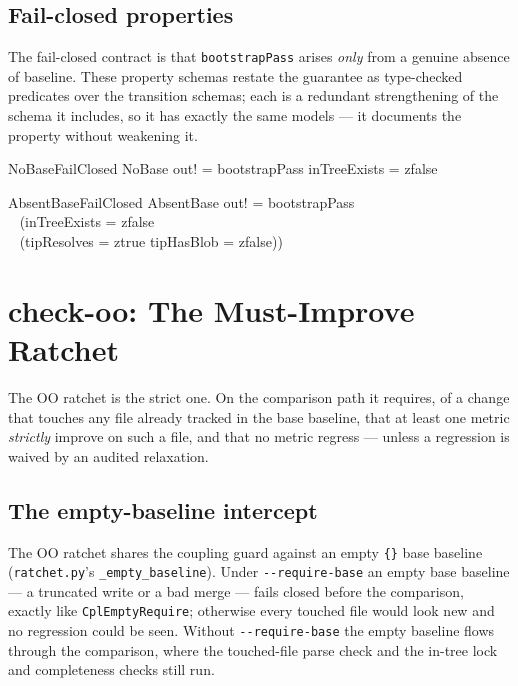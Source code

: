 \documentclass[a4paper,10pt,fleqn]{article}
\begin{document}
\subsection{Fail-closed properties}

The fail-closed contract is that \texttt{bootstrapPass} arises \emph{only}
from a genuine absence of baseline. These property schemas restate the
guarantee as type-checked predicates over the transition schemas; each is
a redundant strengthening of the schema it includes, so it has exactly the
same models --- it documents the property without weakening it.

\begin{schema}{NoBaseFailClosed}
NoBase
\where
out! = bootstrapPass \implies inTreeExists = zfalse
\end{schema}

\begin{schema}{AbsentBaseFailClosed}
AbsentBase
\where
out! = bootstrapPass \implies \\
\quad~ (inTreeExists = zfalse \\
\quad~ \lor (tipResolves = ztrue \land tipHasBlob = zfalse))
\end{schema}

\section{check-oo: The Must-Improve Ratchet}

The OO ratchet is the strict one. On the comparison path it requires, of a
change that touches any file already tracked in the base baseline, that at
least one metric \emph{strictly} improve on such a file, and that no metric
regress --- unless a regression is waived by an audited relaxation.

\subsection{The empty-baseline intercept}

The OO ratchet shares the coupling guard against an empty \texttt{\{\}}
base baseline (\texttt{ratchet.py}'s \texttt{\_empty\_baseline}). Under
\texttt{-{}-require-base} an empty base baseline --- a truncated write or a
bad merge --- fails closed before the comparison, exactly like
\texttt{CplEmptyRequire}; otherwise every touched file would look new and no
regression could be seen. Without \texttt{-{}-require-base} the empty
baseline flows through the comparison, where the touched-file parse check
and the in-tree lock and completeness checks still run.
\end{document}
